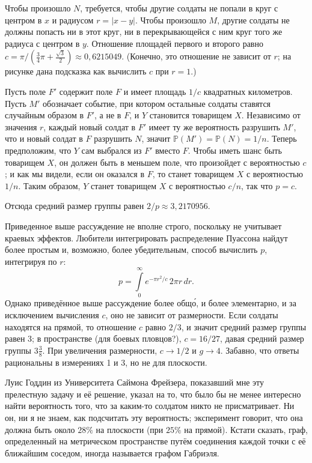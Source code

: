 Чтобы произошло $N$, требуется, чтобы другие солдаты не попали в круг с центром в $x$ и радиусом $r=|x-y|$.
Чтобы произошло $M$, другие солдаты не должны попасть ни в этот круг, ни в перекрывающейся с ним круг того же радиуса с центром в $y$.
Отношение площадей первого и второго равно $c=\pi/(\tfrac34\pi+\tfrac{\sqrt{3}}{2}) \approx 0{,}6215049$. (Конечно, это отношение не зависит от $r$; на рисунке дана подсказка как вычислить $c$ при $r=1$.)

Пусть поле $F'$ содержит поле $F$ и имеет площадь $1/c$ квадратных километров.
Пусть $M'$ обозначает событие, при котором остальные солдаты ставятся случайным образом в $F'$, а не в $F$, и $Y$ становится товарищем $X$.
Независимо от значения $r$, каждый новый солдат в $F'$ имеет ту же вероятность разрушить $M'$, что и новый солдат в $F$ разрушить $N$, значит $\mathbb{P}(M')= \mathbb{P}(N) = 1/n$.
Теперь предположим, что $Y$ сам выбрался из $F'$ вместо $F$.
Чтобы иметь шанс быть товарищем $X$, он должен быть в меньшем поле, что произойдет с вероятностью $c$; и как мы видели, если он оказался в $F$, то станет товарищем $X$ с вероятностью $1/n$.
Таким образом, $Y$ станет товарищем $X$ с вероятностью $c/n$, так что $p=c$.

Отсюда средний размер группы равен $2/p\approx3{,}2170956$.
\heart

Приведенное выше рассуждение не вполне строго, поскольку не учитывает краевых эффектов.
Любители интегрировать распределение Пуассона %
найдут более простым и, возможно, более убедительным, способ вычислить $p$, интегрируя по $r$:
\[p=\int\limits_0^\infty e^{-\pi r^2/c}\,2\pi r\, dr.\]
Однако приведённое выше рассуждение более общ\'{о}, и более элементарно, и за исключением вычисления $c$, оно не зависит от размерности.
Если солдаты находятся на прямой, то отношение $c$ равно $2/3$, и значит средний размер группы равен 3;
в пространстве (для боевых пловцов?), $c = 16/27$, давая средний размер группы $3\tfrac38$.
При увеличения размерности, $c\to 1/2$ и $g\to 4$. 
Забавно, что ответы рациональны в измерениях 1 и 3, но не для плоскости.

Луис Годдин из Университета Саймона Фрейзера, показавший мне эту прелестную задачу и её решение, указал на то, что было бы не менее интересно найти вероятность того, что за каким-то солдатом никто не присматривает.
Ни он, ни я не знаем, как подсчитать эту вероятность; эксперимент говорит, что она должна быть около $28\%$ на плоскости (при $25\%$ на прямой).
Кстати сказать, граф, определенный на метрическом пространстве путём соединения каждой точки с её ближайшим соседом, иногда называется графом Габриэля.

